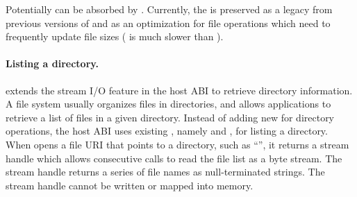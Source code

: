 Potentially  can be absorbed by . Currently, the \hostapi{} is preserved as a legacy from previous versions of \thehostabi{} and as an optimization for file operations which need to frequently update file sizes ( is much slower than ).









\paragraph{Listing a directory.}
\graphene{} extends the stream I/O feature in the host ABI to retrieve directory information.
A file system usually organizes files in directories,
and allows applications to retrieve a list of files in a given directory.
Instead of adding new \hostapis{} for directory operations,
the host ABI uses existing \hostapis{}, namely  and ,
for listing a directory.
When  opens a file URI that points to a directory,
such as ``'',
it returns a stream handle
which allows consecutive  calls to read the file list
as a byte stream.
The stream handle returns a series of file names as null-terminated strings.
The stream handle cannot be written or mapped into memory.








